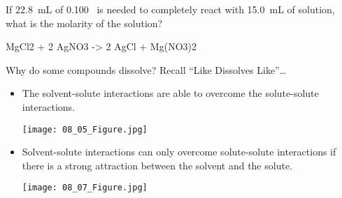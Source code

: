 \documentclass[11pt,letterpaper]{article}
\begin{document}
\clearpage

\begin{onyourown}
	If \SI{22.8}{\milli\liter} of \SI{0.100}{\Molar}~ is needed to
	completely react with \SI{15.0}{\milli\liter} of  solution,
	what is the molarity of the  solution?
	\begin{reaction*}
		MgCl2\aq{} + 2 AgNO3\aq{} -> 2 AgCl\sld{} + Mg(NO3)2\aq{}
	\end{reaction*}
\end{onyourown}

\begin{frame}{Why do some compounds dissolve?}
	Recall ``Like Dissolves Like''\ldots
	\begin{itemize}[<+(1)->]
		\item The \alert{solvent-solute} interactions are able to
			overcome the \alert{solute-solute} interactions.
			\begin{center}
				\texttt{[image: 08\_05\_Figure.jpg]}
			\end{center}
		\item Solvent-solute interactions can only overcome
			solute-solute interactions if there is a \alert{strong
			attraction} between the solvent and the solute.
			\begin{center}
				\texttt{[image: 08\_07\_Figure.jpg]}
			\end{center}
	\end{itemize}
\end{frame}


\clearpage

\begin{frame}
	\begin{center}
	\end{center}
\end{frame}

\end{document}
